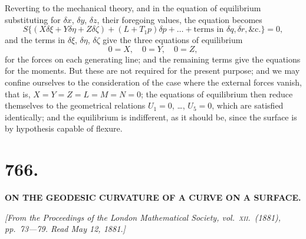 \documentclass[11pt,a4paper]{book}
\begin{document}
Reverting to the mechanical theory, and in the equation of equilibrium substituting for $\delta x$, $\delta y$, $\delta z$, their foregoing values, the equation becomes
\[
S\{(X\delta\xi + Y\delta\eta + Z\delta\zeta) + (L + T_1 p)\delta p + \ldots + \text{terms in } \delta q, \delta r, \&\text{c.}\} = 0,
\]
and the terms in $\delta\xi$, $\delta\eta$, $\delta\zeta$ give the three equations of equilibrium
\[
0 = X,\quad 0 = Y,\quad 0 = Z,
\]
for the forces on each generating line; and the remaining terms give the equations for the moments. But these are not required for the present purpose; and we may confine ourselves to the consideration of the case where the external forces vanish, that is, $X = Y = Z = L = M = N = 0$; the equations of equilibrium then reduce themselves to the geometrical relations $U_1 = 0$, \ldots, $U_5 = 0$, which are satisfied identically; and the equilibrium is indifferent, as it should be, since the surface is by hypothesis capable of flexure.

\newpage

\section*{766.}

\begin{center}
\textbf{ON THE GEODESIC CURVATURE OF A CURVE ON A SURFACE.}
\end{center}

\noindent\textit{[From the \textit{Proceedings of the London Mathematical Society}, vol.\ \textsc{xii}.\ (1881), pp.\ 73---79. Read May 12, 1881.]}

\vspace{\baselineskip}
\end{document}
